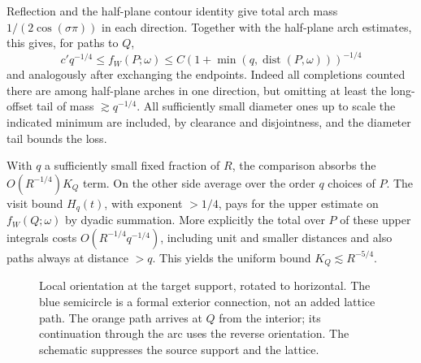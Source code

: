 \documentclass[11pt]{article}
\numberwithin{equation}{section}
\theoremstyle{definition}\newtheorem{definition}[theorem]{Definition}
\theoremstyle{remark}\newtheorem{remark}[theorem]{Remark}
\begin{document}
Reflection and the half-plane contour identity give total arch mass
\(1/(2\cos(\sigma\pi))\) in each direction. Together with the
half-plane arch estimates, this gives, for paths to \(Q\),
\begin{equation}\label{c:tilted-completion-bounds}
 c' q^{-1/4}\le f_W(P;\omega)\le C(1+\min(q,\operatorname{dist}(P,\omega)))^{-1/4}
\end{equation}
and analogously after exchanging the endpoints. Indeed all completions counted there are among half-plane arches in one direction, but omitting at least the long-offset tail of mass \(\gtrsim q^{-1/4}\). All sufficiently small diameter ones up to scale the indicated minimum are included, by clearance and disjointness, and the diameter tail bounds the loss.



With \(q\) a sufficiently small fixed fraction of \(R\), the comparison absorbs the \(O(R^{-1/4})K_Q\) term. On the other side average over the order \(q\) choices of \(P\). The visit bound \(H_q(t)\), with exponent \(>1/4\), pays for the upper estimate on \(f_W(Q;\omega)\) by dyadic summation. More explicitly the total over \(P\) of these upper integrals costs \(O(R^{-1/4}q^{-1/4})\), including unit and smaller distances and also paths always at distance \(>q\). This yields the uniform bound \(K_Q\lesssim R^{-5/4}\).




\begin{figure}[htbp]
\centering
{}
\caption{Local orientation at the target support, rotated to horizontal.
The blue semicircle is a formal exterior connection, not an added lattice
path. The orange path arrives at $Q$ from the interior; its continuation
through the arc uses the reverse orientation. The schematic suppresses
the source support and the lattice.}\label{c:fig:arc}
\end{figure}
\end{document}
